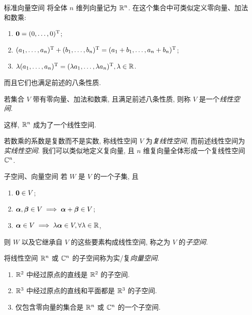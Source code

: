 \begin{frame}{标准向量空间}
	\onslide<+->
	将全体 $n$ 维列向量记为 ${\mathbb{R}}^n$.
	\onslide<+->
	在这个集合中可类似定义零向量、加法和数乘:
	\begin{enumerate}
		\item ${\bf0}=(0,\dots,0)^{\mathrm{T}}$;
		\item $(a_1,\dots,a_n)^{\mathrm{T}}+(b_1,\dots,b_n)^{\mathrm{T}}=(a_1+b_1,\dots,a_n+b_n)^{\mathrm{T}}$;
		\item $\lambda(a_1,\dots,a_n)^{\mathrm{T}}=(\lambda a_1,\dots,\lambda a_n)^{\mathrm{T}},\lambda\in{\mathbb{R}}$.
	\end{enumerate}
	\onslide<+->
	而且它们也满足前述的八条性质.
	\onslide<+->
	\begin{definition}[线性空间]
		若集合 $V$ 带有零向量、加法和数乘, 且满足前述八条性质, 则称 $V$ 是一个\emph{线性空间}.
	\end{definition}
	\onslide<+->
	这样, ${\mathbb{R}}^n$ 成为了一个线性空间.

	\onslide<+->
	若数乘的系数是复数而不是实数, 称线性空间 $V$ 为\emph{复线性空间}, 而前述线性空间为\emph{实线性空间}.
	\onslide<+->
	我们可以类似地定义复向量, 且 $n$ 维复向量全体形成一个复线性空间 ${\mathbb{C}}^n$.
\end{frame}


\begin{frame}{子空间、向量空间\noexer}
	\onslide<+->
	若 $W$ 是 $V$ 的一个子集, 且
	\begin{enumerate}
		\item ${\bf0}\in V$;
		\item ${\boldsymbol{\alpha}},{\boldsymbol{\beta}}\in V\implies {\boldsymbol{\alpha}}+{\boldsymbol{\beta}}\in V$;
		\item ${\boldsymbol{\alpha}}\in V\implies \lambda{\boldsymbol{\alpha}}\in V, \forall\lambda\in{\mathbb{R}}$,
	\end{enumerate}
	\onslide<+->
	则 $W$ 以及它继承自 $V$ 的这些要素构成线性空间, 称之为 $V$ 的\emph{子空间}.

	\onslide<+->
	将线性空间 ${\mathbb{R}}^n$ 或 ${\mathbb{C}}^n$ 的子空间称为实/复\emph{向量空间}.
	\onslide<+->
	\begin{example}
		\begin{enumerate}
			\item ${\mathbb{R}}^2$ 中经过原点的直线是 ${\mathbb{R}}^2$ 的子空间.
			\item ${\mathbb{R}}^3$ 中经过原点的直线和平面都是 ${\mathbb{R}}^3$ 的子空间. 
			\item 仅包含零向量的集合是 ${\mathbb{R}}^n$ 或 ${\mathbb{C}}^n$ 的一个子空间.
		\end{enumerate}
	\end{example}
\end{frame}


